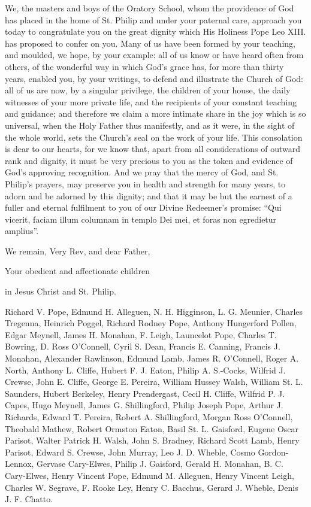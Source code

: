 We, the masters and boys of the Oratory School, whom the providence of
God has placed in the home of St. Philip and under your paternal care,
approach you today to congratulate you on the great dignity which His
Holiness Pope Leo XIII. has proposed to confer on you. Many of us have
been formed by your teaching, and moulded, we hope, by your example:
all of us know or have heard often from others, of the wonderful way
in which God's grace has, for more than thirty years, enabled you, by
your writings, to defend and illustrate the Church of God: all of us
are now, by a singular privilege, the children of your house,
the daily witnesses of your more private life, and the recipients of
your constant teaching and guidance; and therefore we claim a more
intimate share in the joy which is so universal, when the Holy Father
thus manifestly, and as it were, in the sight of the whole world, sets
the Church's seal on the work of your life. This consolation is dear
to our hearts, for we know that, apart from all considerations of
outward rank and dignity, it must be very precious to you as the token
and evidence of God's approving recognition. And we pray that the
mercy of God, and St. Philip's prayers, may preserve you in health and
strength for many years, to adorn and be adorned by this dignity; and
that it may be but the earnest of a fuller and eternal fulfilment to
you of our Divine Redeemer's promise: ``Qui vicerit, faciam illum
columnam in templo Dei mei, et foras non egredietur amplius''.

We remain, Very Rev, and dear Father,

Your obedient and affectionate children

in Jesus Christ and St. Philip.

Richard V. Pope, Edmund H. Alleguen, N. H. Higginson, L. G. Meunier,
Charles Tregenna, Heinrich Poggel, Richard Rodney Pope, Anthony
Hungerford Pollen, Edgar Meynell, James H. Monahan, F. Leigh,
Launcelot Pope, Charles T. Bowring, D. Ross O'Connell, Cyril S. Dean,
Francis E. Canning, Francis J. Monahan, Alexander Rawlinson, Edmund
Lamb, James R. O'Connell, Roger A. North, Anthony L. Cliffe, Hubert F.
J. Eaton, Philip A. S.-Cocks, Wilfrid J. Crewse, John E. Cliffe,
George E. Pereira, William Hussey Walsh, William St. L. Saunders,
Hubert Berkeley, Henry Prendergast, Cecil H. Cliffe, Wilfrid P. J.
Capes, Hugo Meynell, James G. Shillingford, Philip Joseph
Pope, Arthur J. Richards, Edward T. Pereira, Robert A. Shillingford,
Morgan Ross O'Connell, Theobald Mathew, Robert Ormston Eaton, Basil
St. L. Gaisford, Eugene Oscar Parisot, Walter Patrick H. Walsh, John
S. Bradney, Richard Scott Lamb, Henry Parisot, Edward S. Crewse, John
Murray, Leo J. D. Wheble, Cosmo Gordon-Lennox, Gervase Cary-Elwes,
Philip J. Gaisford, Gerald H. Monahan, B. C. Cary-Elwes, Henry Vincent
Pope, Edmund M. Alleguen, Henry Vincent Leigh, Charles W. Segrave, F.
Rooke Ley, Henry C. Bacchus, Gerard J. Wheble, Denis J. F. Chatto.

